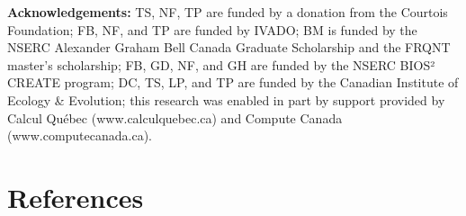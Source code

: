 \documentclass[10pt,oneside]{article}
\begin{document}
\textbf{Acknowledgements:} TS, NF, TP are funded by a donation from the
Courtois Foundation; FB, NF, and TP are funded by IVADO; BM is funded by
the NSERC Alexander Graham Bell Canada Graduate Scholarship and the
FRQNT master's scholarship; FB, GD, NF, and GH are funded by the NSERC
BIOS² CREATE program; DC, TS, LP, and TP are funded by the Canadian
Institute of Ecology \& Evolution; this research was enabled in part by
support provided by Calcul Québec (www.calculquebec.ca) and Compute
Canada (www.computecanada.ca).

\hypertarget{references}{%
\section*{References}\label{references}}
\end{document}
